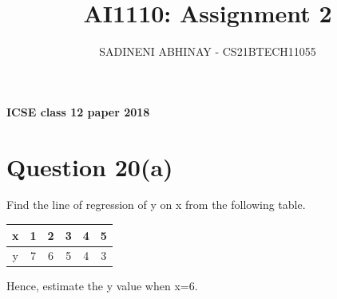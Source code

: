 \documentclass[journal,12pt,twocolumn]{IEEEtran}
\DeclareMathOperator*{\Res}{Res}
\begin{document}
	
	\newcommand{\BEQA}{\begin{eqnarray}}
		\newcommand{\EEQA}{\end{eqnarray}}
	\newcommand{\define}{\stackrel{\triangle}{=}}
	
	\raggedbottom
	\setlength{\parindent}{0pt}
	\providecommand{\mbf}{\mathbf}
	\providecommand{\pr}[1]{\ensuremath{\Pr\left(#1\right)}}
	\providecommand{\qfunc}[1]{\ensuremath{Q\left(#1\right)}}
	\providecommand{\sbrak}[1]{\ensuremath{{}\left[#1\right]}}
	\providecommand{\lsbrak}[1]{\ensuremath{{}\left[#1\right.}}
	\providecommand{\rsbrak}[1]{\ensuremath{{}\left.#1\right]}}
	\providecommand{\brak}[1]{\ensuremath{\left(#1\right)}}
	\providecommand{\lbrak}[1]{\ensuremath{\left(#1\right.}}
	\providecommand{\rbrak}[1]{\ensuremath{\left.#1\right)}}
	\providecommand{\cbrak}[1]{\ensuremath{\left\{#1\right\}}}
	\providecommand{\lcbrak}[1]{\ensuremath{\left\{#1\right.}}
	\providecommand{\rcbrak}[1]{\ensuremath{\left.#1\right\}}}
	\theoremstyle{remark}
	\newtheorem{rem}{Remark}
	\newcommand{\sgn}{\mathop{\mathrm{sgn}}}
	\providecommand{\abs}[1]{$\left\vert#1\right\vert$}
	\providecommand{\res}[1]{\Res\displaylimits_{#1}} 
	\providecommand{\norm}[1]{$\left\lVert#1\right\rVert$}
	\providecommand{\mtx}[1]{\mathbf{#1}}
	\providecommand{\mean}[1]{E$\left[ #1 \right]$}
	\providecommand{\fourier}{\overset{\mathcal{F}}{ \rightleftharpoons}}
	\providecommand{\system}{\overset{\mathcal{H}}{ \longleftrightarrow}}
	\newcommand{\solution}{\noindent \textbf{Solution: }}
	\newcommand{\cosec}{\,\text{cosec}\,}
	\providecommand{\dec}[2]{\ensuremath{\overset{#1}{\underset{#2}{\gtrless}}}}
	\newcommand{\myvec}[1]{\ensuremath{\begin{pmatrix}#1\end{pmatrix}}}
	\newcommand{\mydet}[1]{\ensuremath{\begin{vmatrix}#1\end{vmatrix}}}
	\makeatletter
	\makeatother
	\let\StandardTheFigure\thefigure
	\let\vec\mathbf
	\vspace{3cm}
	\title{AI1110: Assignment 2}
	\author{SADINENI ABHINAY - CS21BTECH11055}
	\maketitle
	\newpage
	\bigskip
	\renewcommand{\thefigure}{\theenumi}
	\renewcommand{\thetable}{\theenumi}
	\textbf{ICSE class 12 paper 2018}
\section{Question 20(a)} 
	Find the line of regression of y on x from the following table.
\begin{table}[H]
	\resizebox{\columnwidth}{!} {
		\begin{tabular}{|c|c|c|c|c|c|}
			\hline
        x &1 &2&3 & 4& 5 \\
         \hline
        y &7 & 6 & 5 &4 & 3\\
        \hline
		\end{tabular}
	}
\end{table}
		Hence, estimate the y value when x=6.
		
\end{document}
